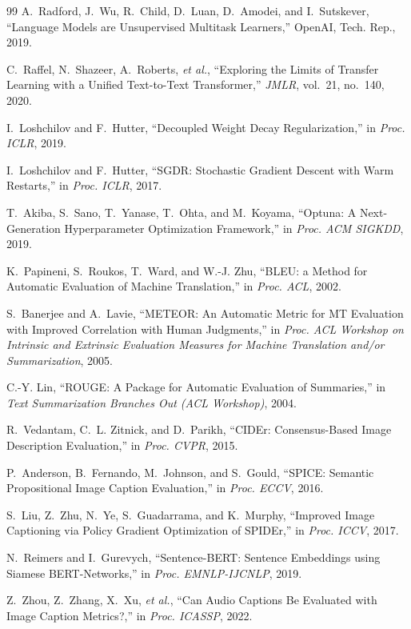 \documentclass[9pt]{report}
\begin{document}
\begin{thebibliography}{99}
A.~Radford, J.~Wu, R.~Child, D.~Luan, D.~Amodei, and I.~Sutskever,
``Language Models are Unsupervised Multitask Learners,'' OpenAI, Tech. Rep., 2019.

C.~Raffel, N.~Shazeer, A.~Roberts, \emph{et al.},
``Exploring the Limits of Transfer Learning with a Unified Text-to-Text Transformer,''
\emph{JMLR}, vol.~21, no.~140, 2020.

I.~Loshchilov and F.~Hutter,
``Decoupled Weight Decay Regularization,'' in \emph{Proc. ICLR}, 2019.

I.~Loshchilov and F.~Hutter,
``SGDR: Stochastic Gradient Descent with Warm Restarts,'' in \emph{Proc. ICLR}, 2017.

T.~Akiba, S.~Sano, T.~Yanase, T.~Ohta, and M.~Koyama,
``Optuna: A Next-Generation Hyperparameter Optimization Framework,'' in \emph{Proc. ACM SIGKDD},
2019.

K.~Papineni, S.~Roukos, T.~Ward, and W.-J. Zhu,
``BLEU: a Method for Automatic Evaluation of Machine Translation,'' in \emph{Proc. ACL}, 2002.

S.~Banerjee and A.~Lavie,
``METEOR: An Automatic Metric for MT Evaluation with Improved Correlation with Human
Judgments,'' in \emph{Proc. ACL Workshop on Intrinsic and Extrinsic Evaluation Measures for
Machine Translation and/or Summarization}, 2005.

C.-Y. Lin,
``ROUGE: A Package for Automatic Evaluation of Summaries,'' in \emph{Text Summarization
Branches Out (ACL Workshop)}, 2004.

R.~Vedantam, C.~L. Zitnick, and D.~Parikh,
``CIDEr: Consensus-Based Image Description Evaluation,'' in \emph{Proc. CVPR}, 2015.

P.~Anderson, B.~Fernando, M.~Johnson, and S.~Gould,
``SPICE: Semantic Propositional Image Caption Evaluation,'' in \emph{Proc. ECCV}, 2016.

S.~Liu, Z.~Zhu, N.~Ye, S.~Guadarrama, and K.~Murphy,
``Improved Image Captioning via Policy Gradient Optimization of SPIDEr,'' in \emph{Proc. ICCV},
2017.

N.~Reimers and I.~Gurevych,
``Sentence-BERT: Sentence Embeddings using Siamese BERT-Networks,'' in \emph{Proc.
EMNLP-IJCNLP}, 2019.

Z.~Zhou, Z.~Zhang, X.~Xu, \emph{et al.},
``Can Audio Captions Be Evaluated with Image Caption Metrics?,'' in \emph{Proc. ICASSP}, 2022.


\end{thebibliography}
\end{document}
